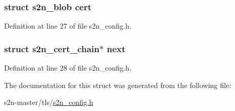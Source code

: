 \subsubsection[{\texorpdfstring{cert}{cert}}]{\setlength{\rightskip}{0pt plus 5cm}struct {\bf s2n\+\_\+blob} cert}\hypertarget{structs2n__cert__chain_a875a2920fc4ec101b865d6006baa3b75}{}\label{structs2n__cert__chain_a875a2920fc4ec101b865d6006baa3b75}


Definition at line 27 of file s2n\+\_\+config.\+h.

\subsubsection[{\texorpdfstring{next}{next}}]{\setlength{\rightskip}{0pt plus 5cm}struct {\bf s2n\+\_\+cert\+\_\+chain}$\ast$ next}\hypertarget{structs2n__cert__chain_ae78fa31ff74363e3d7351dd25f5a0745}{}\label{structs2n__cert__chain_ae78fa31ff74363e3d7351dd25f5a0745}


Definition at line 28 of file s2n\+\_\+config.\+h.



The documentation for this struct was generated from the following file\+:\begin{DoxyCompactItemize}
\item 
s2n-\/master/tls/\hyperlink{s2n__config_8h}{s2n\+\_\+config.\+h}\end{DoxyCompactItemize}
